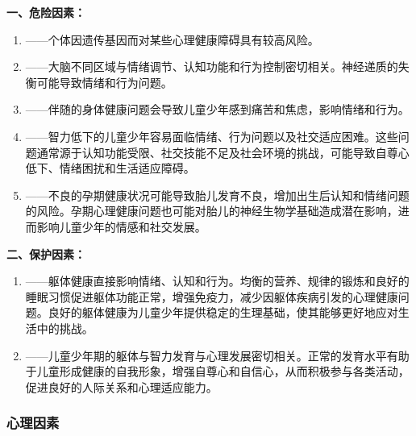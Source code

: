 \begin{defbox}
\textbf{一、危险因素：}

\begin{enumerate}[leftmargin=*]
    \item {}——个体因遗传基因而对某些心理健康障碍具有较高风险。
    \item {}——大脑不同区域与情绪调节、认知功能和行为控制密切相关。神经递质的失衡可能导致情绪和行为问题。
    \item {}——伴随的身体健康问题会导致儿童少年感到痛苦和焦虑，影响情绪和行为。
    \item {}——智力低下的儿童少年容易面临情绪、行为问题以及社交适应困难。这些问题通常源于认知功能受限、社交技能不足及社会环境的挑战，可能导致自尊心低下、情绪困扰和生活适应障碍。
    \item {}——不良的孕期健康状况可能导致胎儿发育不良，增加出生后认知和情绪问题的风险。孕期心理健康问题也可能对胎儿的神经生物学基础造成潜在影响，进而影响儿童少年的情感和社交发展。
\end{enumerate}

\textbf{二、保护因素：}

\begin{enumerate}[leftmargin=*]
    \item {}——躯体健康直接影响情绪、认知和行为。均衡的营养、规律的锻炼和良好的睡眠习惯促进躯体功能正常，增强免疫力，减少因躯体疾病引发的心理健康问题。良好的躯体健康为儿童少年提供稳定的生理基础，使其能够更好地应对生活中的挑战。
    \item {}——儿童少年期的躯体与智力发育与心理发展密切相关。正常的发育水平有助于儿童形成健康的自我形象，增强自尊心和自信心，从而积极参与各类活动，促进良好的人际关系和心理适应能力。
\end{enumerate}
\end{defbox}

\subsubsection{心理因素}

